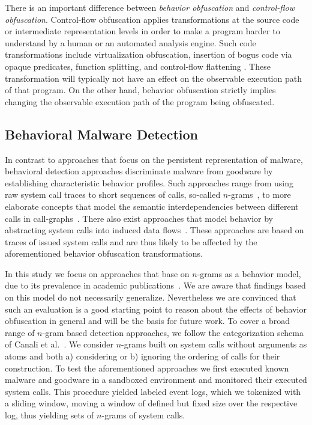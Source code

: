 \documentclass{llncs}
\begin{document}
There is an important difference between \emph{behavior obfuscation} and \emph{control-flow obfuscation}. Control-flow obfuscation applies transformations at the source code or intermediate representation levels in order to make a program harder to understand by a human or an automated analysis engine. Such code transformations include virtualization obfuscation, insertion of bogus code via opaque predicates, function splitting, and control-flow flattening \cite{Collberg2009}. These transformation will typically not have an effect on the observable execution path of that program. On the other hand, behavior obfuscation strictly implies changing the observable execution path of the program being obfuscated.

%
 
\subsection{Behavioral Malware Detection}

In contrast to approaches that focus on the persistent representation of malware, behavioral detection approaches discriminate malware from goodware by establishing characteristic behavior profiles. 
Such approaches range from using raw system call traces to short sequences of 
calls, so-called $n$-grams~\cite{Forrest1996,Rieck2011,wressnegger2013}, to more elaborate concepts that model the semantic interdependencies between different calls in call-graphs~\cite{Park2013,Christodorescu2005,Christodorescu2008}. There also exist approaches that model behavior by abstracting system calls into induced data flows~\cite{Bhatkar2006,Cavallaro2011}. These approaches are based on traces of issued system calls and are thus likely to be affected by the aforementioned behavior obfuscation transformations.

In this study we focus on approaches that base on $n$-grams as a behavior model, due to its prevalence in academic publications~\cite{wressnegger2013}. We are aware that findings based on this model do not necessarily generalize. Nevertheless we are convinced that such an evaluation is a good starting point to reason about the effects of behavior obfuscation in general and will be the basis for future work.
To cover a broad range of $n$-gram based detection approaches, we follow the categorization schema of Canali et al.~\cite{canali2012quantitative}. We consider $n$-grams built on system calls without arguments as atoms and both a) considering or b) ignoring the ordering of calls for their construction.
To test the aforementioned approaches we first executed known malware and goodware in a sandboxed environment and monitored their executed system calls. This procedure yielded labeled event logs, which we tokenized with a sliding window, moving a window of defined but fixed size over the respective log, thus yielding sets of $n$-grams of system calls.
\end{document}
